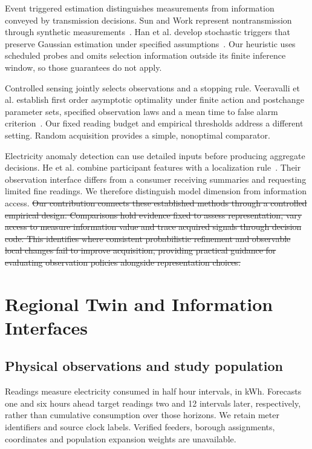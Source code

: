 \documentclass[conference]{IEEEtran}
\providecommand{\DIFdeltex}[1]{{\protect\color{red}\sout{#1}}}                      %
\providecommand{\DIFdelbegin}{} %
\providecommand{\DIFdelend}{} %
\providecommand{\DIFdel}[1]{\texorpdfstring{\DIFdeltex{#1}}{}} %
\begin{document}
Event triggered estimation distinguishes measurements from information conveyed by transmission decisions. Sun and Work represent nontransmission through synthetic measurements~\cite{sun}. Han et al. develop stochastic triggers that preserve Gaussian estimation under specified assumptions~\cite{han}. Our heuristic uses scheduled probes and omits selection information outside its finite inference window, so those guarantees do not apply.

Controlled sensing jointly selects observations and a stopping rule. Veeravalli et al. establish first order asymptotic optimality under finite action and postchange parameter sets, specified observation laws and a mean time to false alarm criterion~\cite{controlled}. Our fixed reading budget and empirical thresholds address a different setting. Random acquisition provides a simple, nonoptimal comparator.

Electricity anomaly detection can use detailed inputs before producing aggregate decisions. He et al. combine participant features with a localization rule~\cite{he}. Their observation interface differs from a consumer receiving summaries and requesting limited fine readings. We therefore distinguish model dimension from information access.
\DIFdelbegin \DIFdel{Our contribution connects these established methods through a controlled empirical design. Comparisons hold evidence fixed to assess representation, vary access to measure information value and trace acquired signals through decision code. This identifies where consistent probabilistic refinement and observable local changes fail to improve acquisition, providing practical guidance for evaluating observation policies alongside representation choices.
}\DIFdelend 




\section{Regional Twin and Information Interfaces}
\subsection{Physical observations and study population}
Readings measure electricity consumed in half hour intervals, in kWh. Forecasts one and six hours ahead target readings two and 12 intervals later, respectively, rather than cumulative consumption over those horizons. We retain meter identifiers and source clock labels. Verified feeders, borough assignments, coordinates and population expansion weights are unavailable.
\end{document}

